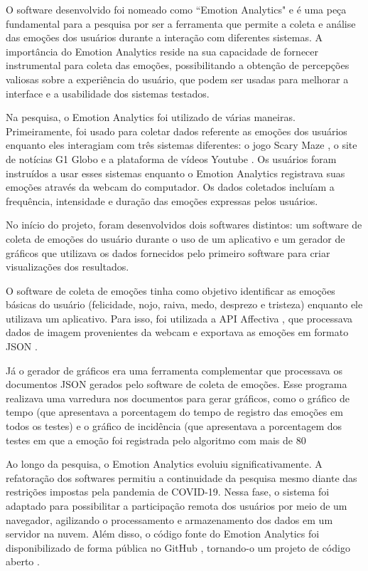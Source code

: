 O software desenvolvido foi nomeado como “Emotion Analytics" e é uma peça fundamental para a pesquisa por ser a ferramenta que permite a coleta e análise das emoções dos usuários durante a interação com diferentes sistemas. A importância do Emotion Analytics reside na sua capacidade de fornecer instrumental para coleta das emoções, possibilitando a obtenção de percepções valiosas sobre a experiência do usuário, que podem ser usadas para melhorar a interface e a usabilidade dos sistemas testados.

Na pesquisa, o Emotion Analytics foi utilizado de várias maneiras. Primeiramente, foi usado para coletar dados referente as emoções dos usuários enquanto eles interagiam com três sistemas diferentes: o jogo Scary Maze \cite{18}, o site de notícias G1 Globo \cite{19} e a plataforma de vídeos Youtube \cite{20}. Os usuários foram instruídos a usar esses sistemas enquanto o Emotion Analytics registrava suas emoções através da webcam do computador. Os dados coletados incluíam a frequência, intensidade e duração das emoções expressas pelos usuários.

No início do projeto, foram desenvolvidos dois softwares distintos: um software de coleta de emoções do usuário durante o uso de um aplicativo e um gerador de gráficos que utilizava os dados fornecidos pelo primeiro software para criar visualizações dos resultados.

O software de coleta de emoções tinha como objetivo identificar as emoções básicas do usuário (felicidade, nojo, raiva, medo, desprezo e tristeza) \cite{5} enquanto ele utilizava um aplicativo. Para isso, foi utilizada a API Affectiva \cite{8}, que processava dados de imagem provenientes da webcam e exportava as emoções em formato JSON \cite{21}.

Já o gerador de gráficos era uma ferramenta complementar que processava os documentos JSON \cite{21} gerados pelo software de coleta de emoções. Esse programa realizava uma varredura nos documentos para gerar gráficos, como o gráfico de tempo (que apresentava a porcentagem do tempo de registro das emoções em todos os testes) e o gráfico de incidência (que apresentava a porcentagem dos testes em que a emoção foi registrada pelo algoritmo com mais de 80%

Ao longo da pesquisa, o Emotion Analytics evoluiu significativamente. A refatoração dos softwares permitiu a continuidade da pesquisa mesmo diante das restrições impostas pela pandemia de COVID-19. Nessa fase, o sistema foi adaptado para possibilitar a participação remota dos usuários por meio de um navegador, agilizando o processamento e armazenamento dos dados em um servidor na nuvem. Além disso, o código fonte do Emotion Analytics foi disponibilizado de forma pública no GitHub \cite{22}\cite{23}, tornando-o um projeto de código aberto \cite{24}.

